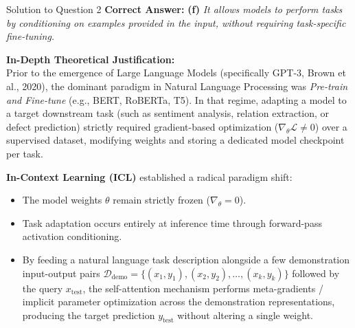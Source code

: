 \documentclass[11pt,a4paper]{article}
\begin{document}
\begin{solutionbox}{Solution to Question 2}
\textbf{Correct Answer:} \textbf{(f)} \textit{It allows models to perform tasks by conditioning on examples provided in the input, without requiring task-specific fine-tuning.}

\medskip
\textbf{In-Depth Theoretical Justification:}\\
Prior to the emergence of Large Language Models (specifically GPT-3, Brown et al., 2020), the dominant paradigm in Natural Language Processing was \textit{Pre-train and Fine-tune} (e.g., BERT, RoBERTa, T5). In that regime, adapting a model to a target downstream task (such as sentiment analysis, relation extraction, or defect prediction) strictly required gradient-based optimization ($\nabla_\theta \mathcal{L} \neq 0$) over a supervised dataset, modifying weights and storing a dedicated model checkpoint per task.

\textbf{In-Context Learning (ICL)} established a radical paradigm shift:
\begin{itemize}
    \item The model weights $\theta$ remain strictly frozen ($\nabla_\theta = 0$).
    \item Task adaptation occurs entirely at inference time through forward-pass activation conditioning.
    \item By feeding a natural language task description alongside a few demonstration input-output pairs $\mathcal{D}_{\text{demo}} = \{(x_1, y_1), (x_2, y_2), \dots, (x_k, y_k)\}$ followed by the query $x_{\text{test}}$, the self-attention mechanism performs meta-gradients / implicit parameter optimization across the demonstration representations, producing the target prediction $y_{\text{test}}$ without altering a single weight.
\end{itemize}


\end{solutionbox}
\end{document}
